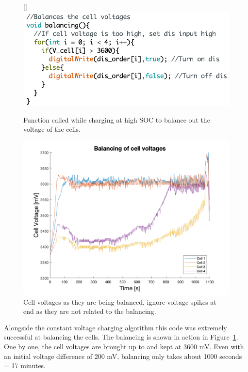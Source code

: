 \documentclass[a4paper]{article}
\begin{document}
\begin{figure}[H]
    \centering
    \begin{minipage}[b]{0.49\textwidth}
        \raisebox{30pt}[\dimexpr{}\baselineskip\relax]{%
        \includegraphics[width=\textwidth]{Balancing_code2.png}
        }%
        \caption{Function called while charging at high SOC to balance out the voltage of the cells.}
        \label{fig:balancingCode}
    \end{minipage}
    \hfill
    \begin{minipage}[b]{0.49\textwidth}
      \includegraphics[width=\textwidth]{balancing.png}
      \caption{Cell voltages as they are being balanced, ignore voltage spikes at end as they are not related to the balancing.}
      \label{fig:balancing}
    \end{minipage}
\end{figure}

Alongside the constant voltage charging algorithm this code was extremely 
successful at balancing the cells. The balancing is shown in action in Figure~\ref{fig:balancing}. 
One by one, the cell voltages are brought up to and kept at 3600 mV. Even with 
an initial voltage difference of 200 mV, balancing only takes about 
1000 seconds = 17 minutes. 
\end{document}
